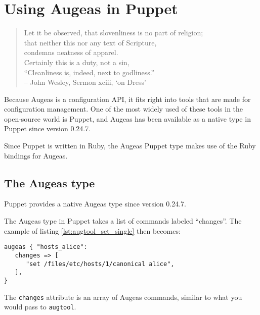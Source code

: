 \chapter{Using Augeas in Puppet}

\begin{verse}
  \begin{flushright}
    \begin{scriptsize}
Let it be observed, that slovenliness is no part of religion; \\
that neither this nor any text of Scripture, \\
condemns neatness of apparel. \\
Certainly this is a duty, not a sin, \\
``Cleanliness is, indeed, next to godliness.'' \\
\bigskip
\tiny{-- John Wesley, Sermon xciii, `on Dress'}
    \end{scriptsize}
  \end{flushright}
\end{verse}
\bigskip

Because Augeas is a configuration API, it fits right into tools that are made for configuration management. One of the most widely used of these tools in the open-source world is Puppet, and Augeas has been available as a native type in Puppet since version 0.24.7.

Since Puppet is written in Ruby, the Augeas Puppet type makes use of the Ruby bindings for Augeas.

\section{The Augeas type}

Puppet provides a native Augeas type since version 0.24.7.

 The Augeas type in Puppet takes a list of commands labeled ``changes''. The example of listing \ref{lst:augtool_set_single} then becomes:

\begin{verbatim}
augeas { "hosts_alice":
   changes => [
      "set /files/etc/hosts/1/canonical alice",
   ],
}
\end{verbatim}

The \verb!changes! attribute is an array of Augeas commands, similar to what you would pass to \verb!augtool!.

